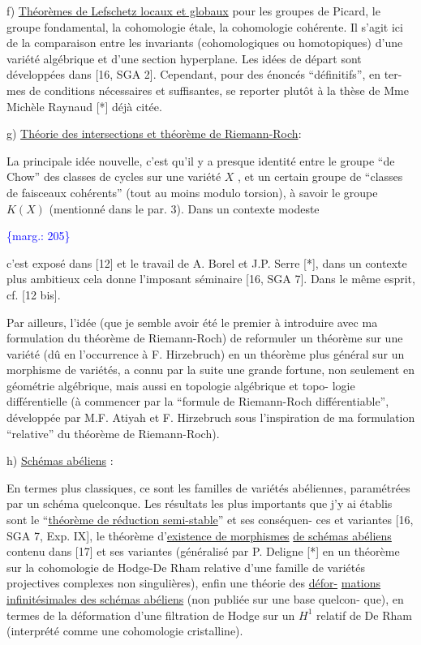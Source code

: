\documentclass[11pt]{article}
\newcommand{\scanpage}[1]{\par\bigskip\noindent{\small\sffamily[scan #1]}\par}
\newcommand{\mspage}[1]{{\small\sffamily[p.\,#1]}}
\newcommand{\margin}[1]{\textcolor{blue}{\{\textsf{marg.:} #1\}}}
\newcommand{\uline}[1]{\underline{#1}}
\begin{document}
f) \uline{Théorèmes de Lefschetz locaux et globaux} pour les groupes de Picard, le
groupe fondamental, la cohomologie étale, la cohomologie cohérente. Il s'agit
ici de la comparaison entre les invariants (cohomologiques ou homotopiques)
d'une variété algébrique et d'une section hyperplane. Les idées de départ sont
développées dans [16, SGA 2]. Cependant, pour des énoncés ``définitifs'', en ter-%
mes de conditions nécessaires et suffisantes, se reporter plutôt à la thèse
de Mme Michèle Raynaud [*] déjà citée.

g) \uline{Théorie des intersections et théorème de Riemann-Roch}:

La principale idée nouvelle, c'est qu'il y a presque identité entre
le groupe ``de Chow'' des classes de cycles sur une variété $X$ , et un certain
groupe de ``classes de faisceaux cohérents'' (tout au moins modulo torsion), à
savoir le groupe $K(X)$ (mentionné dans le par. 3). Dans un contexte modeste

\margin{205}

\clearpage
\scanpage{119/206}
\mspage{- 11 -}

c'est exposé dans [12] et le travail de A. Borel et J.P. Serre [*], dans un
contexte plus ambitieux cela donne l'imposant séminaire [16, SGA 7]. Dans le
même esprit, cf. [12 bis].

Par ailleurs, l'idée (que je semble avoir été le premier à introduire
avec ma formulation du théorème de Riemann-Roch) de reformuler un théorème sur
une variété (dû en l'occurrence à F. Hirzebruch) en un théorème plus général
sur un morphisme de variétés, a connu par la suite une grande fortune, non
seulement en géométrie algébrique, mais aussi en topologie algébrique et topo-%
logie différentielle (à commencer par la ``formule de Riemann-Roch différentiable'',
développée par M.F. Atiyah et F. Hirzebruch sous l'inspiration de ma formulation
``relative'' du théorème de Riemann-Roch).

h) \uline{Schémas abéliens} :

En termes plus classiques, ce sont les familles de variétés abéliennes,
paramétrées par un schéma quelconque. Les résultats les plus importants que
j'y ai établis sont le ``\uline{théorème de réduction semi-stable}'' et ses conséquen-%
ces et variantes [16, SGA 7, Exp. IX], le théorème d'\uline{existence de morphismes}
\uline{de schémas abéliens} contenu dans [17] et ses variantes (généralisé par P. Deligne
[*] en un théorème sur la cohomologie de Hodge-De Rham relative d'une famille
de variétés projectives complexes non singulières), enfin une théorie des \uline{défor-}%
\uline{mations infinitésimales des schémas abéliens} (non publiée sur une base quelcon-%
que), en termes de la déformation d'une filtration de Hodge sur un $H^1$ relatif
de De Rham (interprété comme une cohomologie cristalline).
\end{document}
